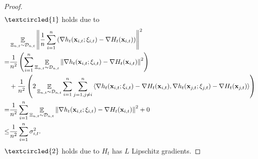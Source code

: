 \documentclass{article}
\begin{document}
\begin{proof}
\begin{align}
\end{align} $\textcircled{1}$ holds due to
\begin{align}
\nonumber
& \mathop{\mathbb{E}}_{ \Xi_{n,t} \sim \mathcal{D}_{n,t} }\left\lVert\frac{1}{n}\sum_{i=1}^n \left(  \nabla h_t({\bf x}_{i,t};\xi_{i,t}) - \nabla H_t({\bf x}_{i,t})  \right) \right\rVert^2 \\ \nonumber 
= & \frac{1}{n^2}\left(  \sum_{i=1}^n \mathop{\mathbb{E}}_{ \Xi_{n,t} \sim \mathcal{D}_{n,t} }\left\lVert \nabla h_t({\bf x}_{i,t};\xi_{i,t}) - \nabla H_t({\bf x}_{i,t}) \right\rVert^2   \right) \\ \nonumber 
& + \frac{1}{n^2}\left( 2\mathop{\mathbb{E}}_{ \Xi_{n,t} \sim \mathcal{D}_{n,t} }\sum_{i=1}^n\sum_{j=1, j\neq i}^n\left\langle \nabla h_t({\bf x}_{i,t};\xi_{i,t}) - \nabla H_t({\bf x}_{i,t}),  \nabla h_t({\bf x}_{j,t};\xi_{j,t}) - \nabla H_t({\bf x}_{j,t}) \right\rangle  \right) \\ \nonumber
= & \frac{1}{n^2}\sum_{i=1}^n \mathop{\mathbb{E}}_{ \Xi_{n,t} \sim \mathcal{D}_{n,t} }\left\lVert \nabla h_t({\bf x}_{i,t};\xi_{i,t}) - \nabla H_t({\bf x}_{i,t}) \right\rVert^2 + 0 \\ \nonumber
\le & \frac{1}{n^2}\sum_{i=1}^n \sigma_{i,t}^2.
\end{align} $\textcircled{2}$ holds due to $H_t$ has $L$ Lipschitz gradients.



\end{proof}
\end{document}
